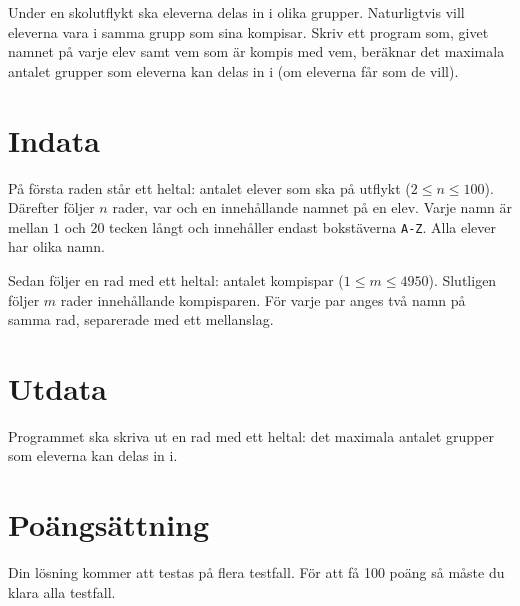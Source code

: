 Under en skolutflykt ska eleverna delas in i olika grupper.
Naturligtvis vill eleverna vara i samma grupp som sina kompisar.
Skriv ett program som, givet namnet på varje elev samt vem som är kompis med vem, beräknar det maximala antalet grupper som eleverna kan delas in i (om eleverna får som de vill).

\section*{Indata}
På första raden står ett heltal: antalet elever som ska på utflykt ($2 \le n \le 100$).
Därefter följer $n$ rader, var och en innehållande namnet på en elev.
Varje namn är mellan $1$ och $20$ tecken långt och innehåller endast bokstäverna \texttt{A-Z}.
Alla elever har olika namn.

Sedan följer en rad med ett heltal: antalet kompispar ($1 \le m \le 4950$).
Slutligen följer $m$ rader innehållande kompisparen.
För varje par anges två namn på samma rad, separerade med ett mellanslag.

\section*{Utdata}
Programmet ska skriva ut en rad med ett heltal: det maximala antalet grupper som eleverna kan delas in i.

\section*{Poängsättning}
Din lösning kommer att testas på flera testfall. För att få 100 poäng så måste du klara alla testfall.
